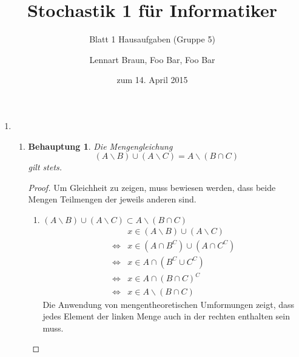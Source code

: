 \documentclass[a4paper]{scrartcl}
\title{Stochastik 1 für Informatiker}
\subtitle{Blatt 1 Hausaufgaben (Gruppe 5)}
\author{
	Lennart Braun,
    Foo Bar,
    Foo Bar
}
\date{zum 14. April 2015}
\newtheorem*{behaupt}{Behauptung}
\newcommand{\gdw}{\Leftrightarrow}
\begin{document}

\begin{enumerate}[label=\bfseries\arabic*.]
    \item
        \begin{enumerate}[label=(\alph*)]
            \item
                \begin{behaupt}
                    Die Mengengleichung
                    \begin{equation}
                        (A \backslash B) \cup (A \backslash C)
                        = A \backslash (B \cap C)
                    \end{equation}
                    gilt stets.
                \end{behaupt}
                \begin{proof}
                    Um Gleichheit zu zeigen, muss bewiesen werden, dass beide
                    Mengen Teilmengen der jeweils anderen sind.
                    \begin{enumerate}
                        \item
                            $(A \backslash B) \cup (A \backslash C)
                            \subset A \backslash (B \cap C)$ \\
                            \begin{equation}
                                \begin{split}
                                         &x \in (A \backslash B)
                                            \cup (A \backslash C) \\
                                    \gdw &x \in (A \cap B^C) \cup (A \cap C^C) \\
                                    \gdw &x \in A \cap (B^C \cup C^C) \\
                                    \gdw &x \in A \cap (B \cap C)^C \\
                                    \gdw &x \in A \backslash (B \cap C)
                                \end{split}
                            \end{equation}
                            Die Anwendung von mengentheoretischen Umformungen
                            zeigt, dass jedes Element der linken Menge auch in
                            der rechten enthalten sein muss.


\end{enumerate}
\end{proof}
\end{enumerate}
\end{enumerate}
\end{document}
